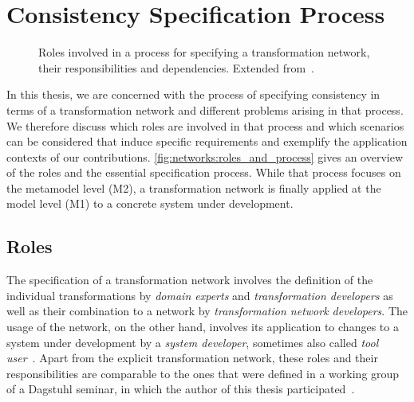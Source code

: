 \section{Consistency Specification Process}
\label{chap:networks:specification_process}

\begin{figure}
    \centering
    
    \caption[Roles in a transformation network specification process]{Roles involved in a process for specifying a transformation network, their responsibilities and dependencies. Extended from~.}
    \label{fig:networks:roles_and_process}
\end{figure}

In this thesis, we are concerned with the process of specifying consistency in terms of a transformation network and different problems arising in that process.
We therefore discuss which roles are involved in that process and which scenarios can be considered that induce specific requirements and exemplify the application contexts of our contributions.
\autoref{fig:networks:roles_and_process} gives an overview of the roles and the essential specification process.
While that process focuses on the metamodel level (M2), a transformation network is finally applied at the model level (M1) to a concrete system under development.

\subsection{Roles}

The specification of a transformation network involves the definition of the individual transformations by \emph{domain experts} and \emph{transformation developers} as well as their combination to a network by \emph{transformation network developers}.
The usage of the network, on the other hand, involves its application to changes to a system under development by a \emph{system developer}, sometimes also called \emph{tool user}~\cite{klare2019dagstuhl}.
Apart from the explicit transformation network, these roles and their responsibilities are comparable to the ones that were defined in a working group of a Dagstuhl seminar, in which the author of this thesis participated~\cite{klare2019dagstuhl}.

